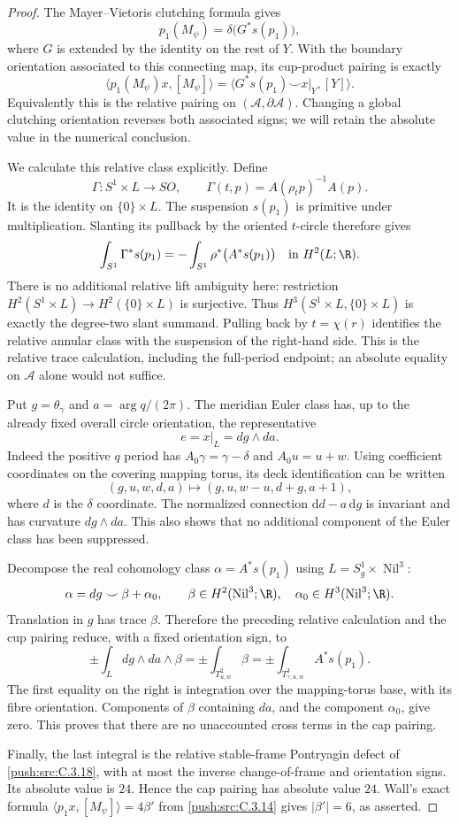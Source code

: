 \begin{proof}
The Mayer--Vietoris clutching formula gives
\[
 p_1(M_\psi)=\delta\bigl(G^*s(p_1)\bigr),
\]
where $G$ is extended by the identity on the rest of $Y$.
With the boundary orientation associated to this connecting
map, its cup-product pairing is exactly
\[
 \langle p_1(M_\psi)x,[M_\psi]\rangle
 =\langle G^*s(p_1)\smile x|_Y,[Y]\rangle.
\]
Equivalently this is the relative pairing on
$(\mathcal A,\partial\mathcal A)$. Changing a global
clutching orientation reverses both associated signs;
we will retain the absolute value in the numerical conclusion.

We calculate this relative class explicitly. Define
\[
 \Gamma:S^1\times L\longrightarrow SO,
 \qquad\Gamma(t,p)=A(\rho_t p)^{-1}A(p).
\]
It is the identity on $\{0\}\times L$. The suspension
$s(p_1)$ is primitive under multiplication. Slanting its
pullback by the oriented $t$-circle therefore gives
\[
 \int_{S^1}\Gamma^*s(p_1)
 =-\int_{S^1}\rho^*\bigl(A^*s(p_1)\bigr)
 \quad\hbox{in }H^2(L;\R).
\]
There is no additional relative lift ambiguity here:
restriction $H^2(S^1\times L)\to H^2(\{0\}\times L)$
is surjective. Thus $H^3(S^1\times L,\{0\}\times L)$
is exactly the degree-two slant summand. Pulling back by
$t=\chi(r)$ identifies the relative annular class with
the suspension of the right-hand side. This is the
relative trace calculation, including the full-period
endpoint; an absolute equality on $\mathcal A$ alone
would not suffice.

Put $g=\theta_\gamma$ and $a=\arg q/(2\pi)$. The meridian
Euler class has, up to the already fixed overall circle
orientation, the representative
\[
 e=x|_L=dg\wedge da.
\]
Indeed the positive $q$ period has
$A_0\gamma=\gamma-\delta$ and $A_0u=u+w$.
Using coefficient coordinates on the covering mapping
torus, its deck identification can be written
\[
 (g,u,w,d,a)\longmapsto(g,u,w-u,d+g,a+1),
\]
where $d$ is the $\delta$ coordinate. The normalized
connection $\mathrm d d-a\,\mathrm d g$ is invariant and has curvature
$dg\wedge da$. This also shows that no additional
component of the Euler class has been suppressed.

Decompose the real cohomology class
$\alpha=A^*s(p_1)$ using $L=S^1_g\times\operatorname{Nil}^3$:
\[
 \alpha=dg\smile\beta+\alpha_0,
 \qquad\beta\in H^2(\operatorname{Nil}^3;\R),\quad
 \alpha_0\in H^3(\operatorname{Nil}^3;\R).
\]
Translation in $g$ has trace $\beta$. Therefore the preceding
relative calculation and the cup pairing reduce, with a
fixed orientation sign, to
\[
 \pm\int_L dg\wedge da\wedge\beta
 =\pm\int_{T^2_{u,w}}\beta
 =\pm\int_{T^3_{\gamma,u,w}}A^*s(p_1).
\]
The first equality on the right is integration over the
mapping-torus base, with its fibre orientation. Components
of $\beta$ containing $da$, and the component $\alpha_0$,
give zero. This proves that there are no unaccounted
cross terms in the cap pairing.

Finally, the last integral is the relative stable-frame
Pontryagin defect of \ref{push:src:C.3.18}, with at most the inverse
change-of-frame and orientation signs. Its absolute value
is $24$. Hence the cap pairing has absolute value $24$.
Wall's exact formula $\langle p_1x,[M_\psi]\rangle=4\beta'$
from \ref{push:src:C.3.14} gives $|\beta'|=6$, as asserted.
\end{proof}

